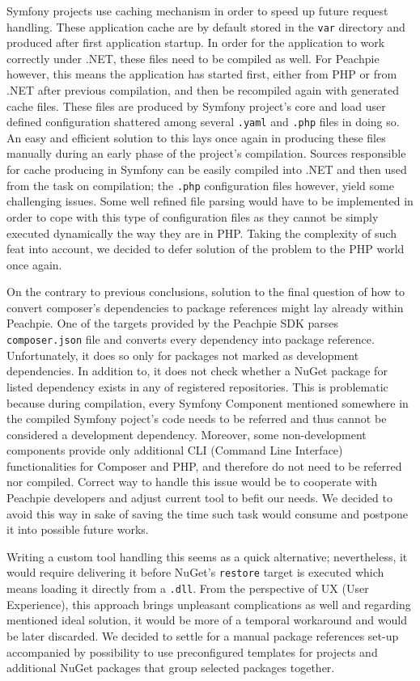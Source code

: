 Symfony projects use caching mechanism in order to speed up future request handling. These application cache are by default stored in the \texttt{var} directory and produced after first application startup. In order for the application to work correctly under .NET, these files need to be compiled as well. For Peachpie however, this means the application has started first, either from PHP or from .NET after previous compilation, and then be recompiled again with generated cache files. These files are produced by Symfony project's core and load user defined configuration shattered among several \texttt{.yaml} and \texttt{.php} files in doing so. An easy and efficient solution to this lays once again in producing these files manually during an early phase of the project's compilation. Sources responsible for cache producing in Symfony can be easily compiled into .NET and then used from the task on compilation; the \texttt{.php} configuration files however, yield some challenging issues. Some well refined file parsing would have to be implemented in order to cope with this type of configuration files as they cannot be simply executed dynamically the way they are in PHP. Taking the complexity of such feat into account, we decided to defer solution of the problem to the PHP world once again.

On the contrary to previous conclusions, solution to the final question of how to convert composer's dependencies to package references might lay already within Peachpie. One of the targets provided by the Peachpie SDK parses \texttt{composer.json} file and converts every dependency into package reference. Unfortunately, it does so only for packages not marked as development dependencies. In addition to, it does not check whether a NuGet package for listed dependency exists in any of registered repositories. This is problematic because during compilation, every Symfony Component mentioned somewhere in the compiled Symfony poject's code needs to be referred and thus cannot be considered a development dependency. Moreover, some non-development components provide only additional CLI (Command Line Interface) functionalities for Composer and PHP, and therefore do not need to be referred nor compiled. Correct way to handle this issue would be to cooperate with Peachpie developers and adjust current tool to befit our needs. We decided to avoid this way in sake of saving the time such task would consume and postpone it into possible future works.

Writing a custom tool handling this seems as a quick alternative; nevertheless, it would require delivering it before NuGet's \texttt{restore} target is executed which means loading it directly from a \texttt{.dll}. From the perspective of UX (User Experience), this approach brings unpleasant complications as well and regarding mentioned ideal solution, it would be more of a temporal workaround and would be later discarded. We decided to settle for a manual package references set-up accompanied by possibility to use preconfigured templates for projects and additional NuGet packages that group selected packages together.

